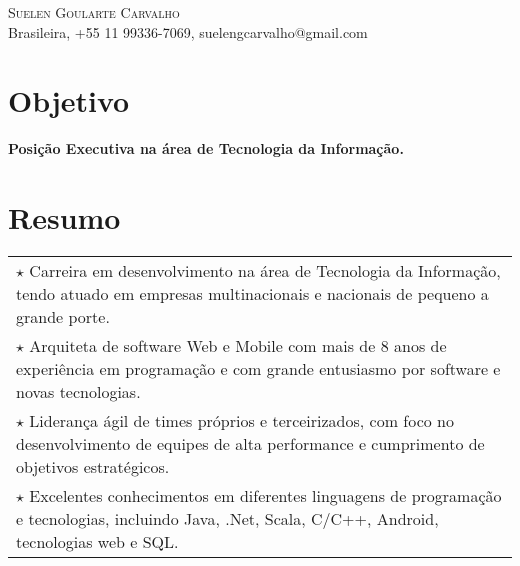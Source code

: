 \documentclass[a4paper, oneside, final]{scrartcl}
\newcommand{\vspc}{\vspace{0.15cm}} %
\begin{document}
\begin{center}
\textsc{\Huge{Suelen Goularte Carvalho}} \vspc\\
{\small Brasileira, +55 11 99336-7069, suelengcarvalho@gmail.com} 


\section{Objetivo}
	{\large \bf Posição Executiva na área de Tecnologia da Informação.}



\section{Resumo}
\begin{tabularx}{1\linewidth}{X}
	$\star$ Carreira em desenvolvimento na área de Tecnologia da Informação, tendo atuado em empresas multinacionais e nacionais de pequeno a grande porte. \vspc\\

	$\star$ Arquiteta de software Web e Mobile com mais de 8 anos de experiência em programação e com grande entusiasmo por software e novas tecnologias. \vspc\\
		
	$\star$ Liderança ágil de times próprios e terceirizados, com foco no desenvolvimento de equipes de alta performance e cumprimento de objetivos estratégicos. \vspc\\
	
	$\star$ Excelentes conhecimentos em diferentes linguagens de programação e tecnologias, incluindo Java, .Net, Scala, C/C++, Android, tecnologias web e SQL. \vspc\\
\end{tabularx}



\end{center}
\end{document}

